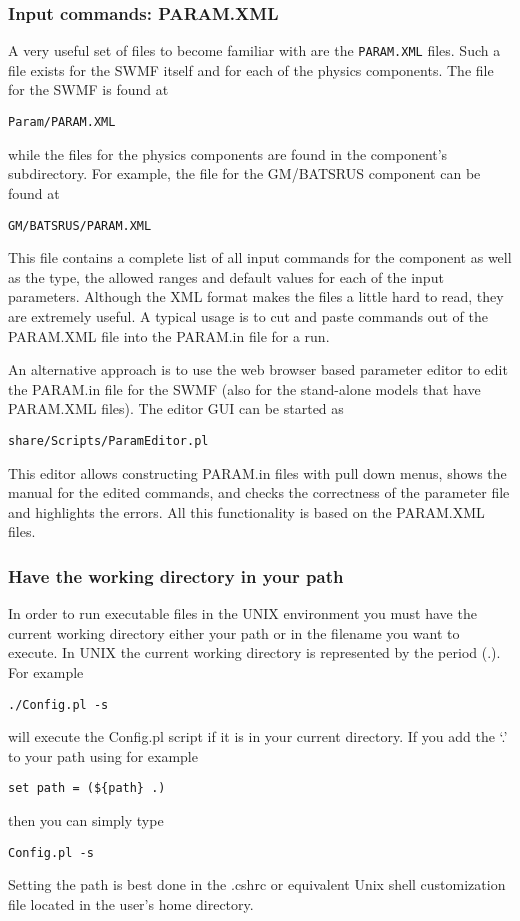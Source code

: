 \subsubsection{Input commands: PARAM.XML}

A very useful set of files to become familiar with are the {\tt PARAM.XML}
files.  Such a file exists for the SWMF itself and for each of the
physics components.  The file for the SWMF is found at
\begin{verbatim}
Param/PARAM.XML
\end{verbatim}
while the files for the physics components are found in the component's
subdirectory.  For example, the file for the GM/BATSRUS component can
be found at
\begin{verbatim}
GM/BATSRUS/PARAM.XML
\end{verbatim}
This file contains a complete list of all input commands for the
component as well as the type, the allowed ranges and default values
for each of the input parameters.
Although the XML format makes the files a little hard to read, they are
extremely useful.  A typical usage is to cut and paste commands out of the
PARAM.XML file into the PARAM.in file for a run. 

An alternative approach is to use the web browser based parameter editor 
to edit the PARAM.in file for the SWMF 
(also for the stand-alone models that have PARAM.XML files).
The editor GUI can be started as
\begin{verbatim}
share/Scripts/ParamEditor.pl
\end{verbatim}
This editor allows constructing PARAM.in files with pull down menus, 
shows the manual for the edited commands, and checks the correctness of
the parameter file and highlights the errors. All this functionality 
is based on the PARAM.XML files.

\subsubsection{Have the working directory in your path}

In order to run executable files in the UNIX environment you must have
the current working directory either your path or in the filename you
want to execute. In UNIX the current working directory is represented
by the period (.).  For example
\begin{verbatim} 
./Config.pl -s
\end{verbatim}
will execute the Config.pl script if it is in your current directory.  
If you add the `.' to your path using for example
\begin{verbatim}
set path = (${path} .)
\end{verbatim}
then you can simply type
\begin{verbatim} 
Config.pl -s
\end{verbatim}
Setting the path is best done in the .cshrc or equivalent Unix shell 
customization file located in the user's home directory.

